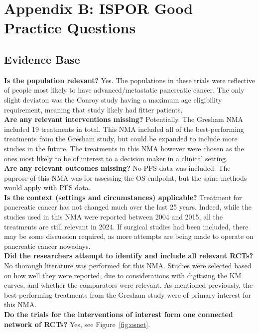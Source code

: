 \section{Appendix B: ISPOR Good Practice Questions}\label{isporqs}

\subsection{Evidence Base}
\textbf{Is the population relevant?} Yes. The populations in these trials were reflective of people most likely to have advanced/metastatic pancreatic cancer. The only slight deviaton was the Conroy study having a maximum age eligibility requirement, meaning that study likely had fitter patients.\\ 

\textbf{Are any relevant interventions missing?} Potentially. The Gresham NMA included 19 treatments in total. This NMA included all of the best-performing treatments from the Gresham study, but could be expanded to include more studies in the future. The treatments in this NMA however were chosen as the ones most likely to be of interest to a decision maker in a clinical setting. \\ 

\textbf{Are any relevant outcomes missing?} No PFS data was included. The puprose of this NMA was for assessing the OS endpoint, but the same methods would apply with PFS data. \\

\textbf{Is the context (settings and circumstances) applicable?} Treatment for pancreatic cancer has not changed much over the last 25 years. Indeed, while the studies used in this NMA were reported between 2004 and 2015, all the treatments are still relevant in 2024. If surgical studies had been included, there may be some discussion required, as more attempts are being made to operate on pancreatic cancer nowadays. \\

\textbf{Did the researchers attempt to identify and include all
relevant RCTs?} No thorough literature was performed for this NMA. Studies were selected based on how well they were reported, due to considerations with digitising the KM curves, and whether the comparators were relevant. As mentioned previously, the best-performing treatments from the Gresham study were of primary interest for this NMA.\\

\textbf{Do the trials for the interventions of interest form one
connected network of RCTs?} Yes, see Figure~\ref{fig:osnet}.\\

